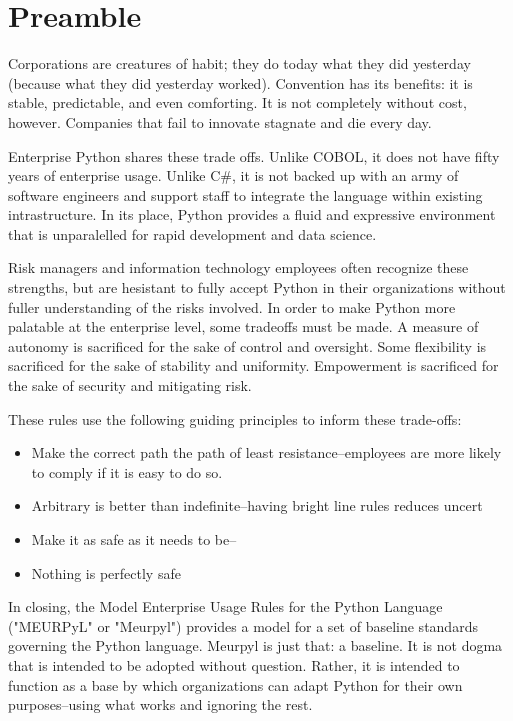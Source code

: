 

\section{Preamble}

Corporations are creatures of habit; they do today what they did yesterday (because what they did yesterday worked). Convention has its benefits: it is stable, predictable, and even comforting. It is not completely without cost, however. Companies that fail to innovate stagnate and die every day.

Enterprise Python shares these trade offs. Unlike COBOL, it does not have fifty years of enterprise usage. Unlike C\#, it is not backed up with an army of software engineers and support staff to integrate the language within existing intrastructure. In its place, Python provides a fluid and expressive environment that is unparalelled for rapid development and data science.

Risk managers and information technology employees often recognize these strengths, but are hesistant to fully accept Python in their organizations without fuller understanding of the risks involved. In order to make Python more palatable at the enterprise level, some tradeoffs must be made. A measure of autonomy is sacrificed for the sake of control and oversight. Some flexibility is sacrificed for the sake of stability and uniformity. Empowerment is sacrificed for the sake of security and mitigating risk. 

These rules use the following guiding principles to inform these trade-offs:

\begin{itemize}
	\item Make the correct path the path of least resistance--employees are more likely to comply if it is easy to do so.
	\item Arbitrary is better than indefinite--having bright line rules reduces uncert
	\item Make it as safe as it needs to be--
	\item Nothing is perfectly safe
\end{itemize}

In closing, the Model Enterprise Usage Rules for the Python Language ("MEURPyL" or "Meurpyl") provides a model for a set of baseline standards governing the Python language. Meurpyl is just that: a baseline. It is not dogma that is intended to be adopted without question. Rather, it is intended to function as a base by which organizations can adapt Python for their own purposes--using what works and ignoring the rest.
